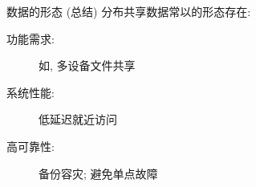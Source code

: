% 
\begin{frame}{数据的形态 (总结)}
  分布共享数据常以的形态存在:
  \begin{description}
    \item[功能需求:] 如, 多设备文件共享
    \item[系统性能:] 低延迟就近访问
    \item[高可靠性:] 备份容灾; 避免单点故障
  \end{description}
\end{frame}
